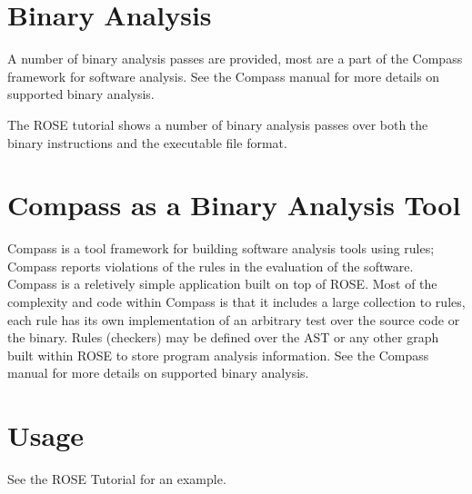 \section{Binary Analysis}

   A number of binary analysis passes are provided, most are a part of the Compass
framework for software analysis.  See the Compass manual for more details on supported
binary analysis.

   The ROSE tutorial shows a number of binary analysis passes over both the binary
instructions and the executable file format.

\section{Compass as a Binary Analysis Tool}

   Compass is a tool framework for building software analysis tools using rules; Compass
reports violations of the rules in the evaluation of the software.  Compass is a
reletively simple application built on top of ROSE.  Most of the complexity and code 
within Compass is that it includes a large collection to rules, each rule has its
own implementation of an arbitrary test over the source code or the binary.  Rules
(checkers) may be defined over the AST or any other graph built within ROSE to store 
program analysis information. See the Compass manual for more details on supported
binary analysis.

\section{Usage}
     See the ROSE Tutorial for an example.



